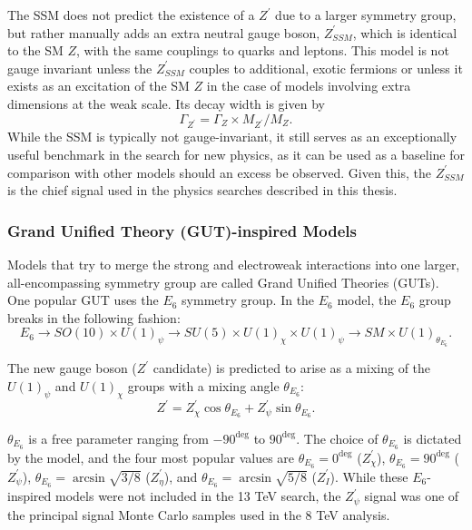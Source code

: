 The SSM does not predict the existence of a $Z^{\prime}$ due to a larger symmetry group, but rather manually adds an extra neutral gauge boson, $Z^{\prime}_{SSM}$, which is identical to the SM $Z$, with the same couplings to quarks and leptons. This model is not gauge invariant unless the $Z^{\prime}_{SSM}$ couples to additional, exotic fermions or unless it exists as an excitation of the SM $Z$ in the case of models involving extra dimensions at the weak scale. Its decay width is given by 
\begin{equation}
\Gamma_{Z^{\prime}} = \Gamma_Z \times M_{Z^{\prime}}/M_{Z}.
\end{equation}
\noindent While the SSM is typically not gauge-invariant, it still serves as an exceptionally useful benchmark in the search for new physics, as it can be used as a baseline for comparison with other models should an excess be observed.\cite{SSM} Given this, the $Z^{\prime}_{SSM}$ is the chief signal used in the physics searches described in this thesis. 

\subsubsection{Grand Unified Theory (GUT)-inspired Models}

Models that try to merge the strong and electroweak interactions into one larger, all-encompassing symmetry group are called Grand Unified Theories (GUTs). One popular GUT uses the $E_6$ symmetry group. In the $E_6$ model, the $E_6$ group breaks in the following fashion:
\begin{equation}
E_6 \to SO(10) \times U(1)_\psi \to SU(5) \times U(1)_\chi \times U(1)_\psi \to SM \times U(1)_{\theta_{E_6}}.
\end{equation}

\noindent The new gauge boson ($Z^\prime$ candidate) is predicted to arise as a mixing of the $U(1)_\psi$ and $U(1)_\chi$ groups with a mixing angle $\theta_{E_6}$:
\begin{equation}
Z^{\prime} = Z^\prime_\chi \cos{\theta_{E_6}} + Z^\prime_\psi \sin{\theta_{E_6}}.
\end{equation}

\noindent$\theta_{E_6}$ is a free parameter ranging from $-90^{\deg}$ to $90^{\deg}$. The choice of $\theta_{E_6}$ is dictated by the model, and the four most popular values are $\theta_{E_6} = 0^{\deg}$ ($Z^\prime_\chi$), $\theta_{E_6} = 90^{\deg}$ ($Z^\prime_\psi$), $\theta_{E_6} = \arcsin{\sqrt{3/8}}$ ($Z^\prime_\eta$), and $\theta_{E_6} = \arcsin{\sqrt{5/8}}$ ($Z^\prime_I$).\cite{E6} While these $E_6$-inspired models were not included in the 13 TeV search, the $Z^\prime_\psi$ signal was one of the principal signal Monte Carlo samples used in the 8 TeV analysis.